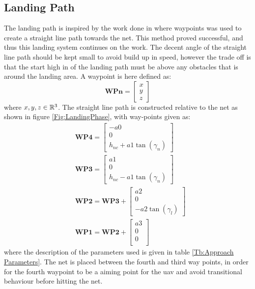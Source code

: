 \subsection{Landing Path}\label{SS:netApproach}
The landing path is inspired by the work done in \citep{Skulstad&Syversen} where waypoints was used to create a straight line path towards the net. This method proved successful, and thus this landing system continues on the work. The decent angle of the straight line path should be kept small to avoid build up in speed, however the trade off is that the start high in of the landing path must be above any obstacles that is around the landing area. A waypoint is here defined as:
\begin{equation}
\textbf{WPn} = \begin{bmatrix}
x \\
y \\
z
\end{bmatrix}
\end{equation}
where $x,y,z \in \Bbb R^3$. The straight line path is constructed relative to the net as shown in figure \ref{Fig:LandingPhase}, with way-points given as:
\begin{subequations}
\begin{align}
&\mathbf{WP4} = 
\begin{bmatrix}
-a0 \\
0 \\
h_{nc} + a1\tan(\gamma_n) 
\end{bmatrix}\\
&\mathbf{WP3} = 
\begin{bmatrix}
a1 \\
0 \\
h_{nc} - a1\tan(\gamma_n)
\end{bmatrix}\\
&\mathbf{WP2} = \mathbf{WP3} + 
\begin{bmatrix}
a2 \\
0 \\
-a2\tan(\gamma_l)
\end{bmatrix}\\
&\mathbf{WP1} = \mathbf{WP2} + 
\begin{bmatrix}
a3 \\
0 \\
0 \\
\end{bmatrix}
\end{align}
\end{subequations}
where the description of the parameters used is given in table \ref{Tb:Approach Parameters}. The net is placed between the fourth and third way points, in order for the fourth waypoint to be a aiming point for the \gls{uav} and avoid transitional behaviour before hitting the net.
